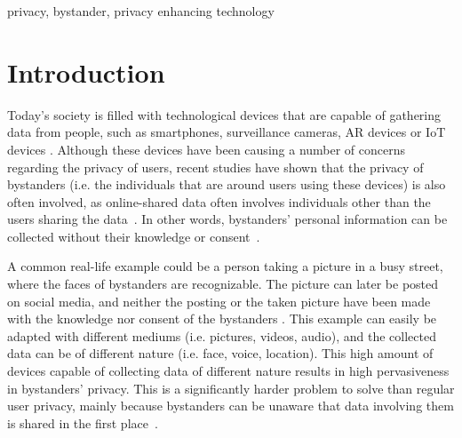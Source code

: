 \documentclass[conference]{IEEEtran}
\begin{document}
\begin{IEEEkeywords}
privacy, bystander, privacy enhancing technology
\end{IEEEkeywords}

\section{Introduction}\label{Intro}
Today's society is filled with technological devices that are capable of gathering data from people, such as smartphones, surveillance cameras, \ac{AR} devices or \ac{IoT} devices \cite{lu2017privacy, shu2016cardea, denning2014situ}. Although these devices have been causing a number of concerns regarding the privacy of users, recent studies have shown that the privacy of bystanders (i.e. the individuals that are around users using these devices) is also often involved, as online-shared data often involves individuals other than the users sharing the data~\cite{olteanu2018consensual}. In other words, bystanders' personal information can be collected without their knowledge or consent~\cite{lu2017privacy}.

A common real-life example could be a person taking a picture in a busy street, where the faces of bystanders are recognizable. The picture can later be posted on social media, and neither the posting or the taken picture have been made with the knowledge nor consent of the bystanders \cite{shu2016cardea}. This example can easily be adapted with different mediums (i.e. pictures, videos, audio), and the collected data can be of different nature (i.e. face, voice, location). This high amount of devices capable of collecting data of different nature results in high pervasiveness in bystanders' privacy. This is a significantly harder problem to solve than regular user privacy, mainly because bystanders can be unaware that data involving them is shared in the first place~\cite{olteanu2018consensual}.
\end{document}
